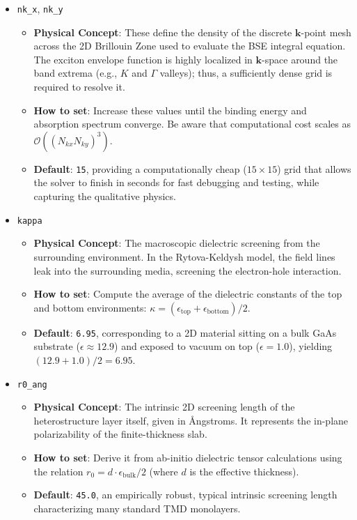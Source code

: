\documentclass[11pt, a4paper]{article}
\begin{document}
\begin{itemize}
    \item \texttt{nk\_x}, \texttt{nk\_y}
    \begin{itemize}
        \item \textbf{Physical Concept}: These define the density of the discrete $\mathbf{k}$-point mesh across the 2D Brillouin Zone used to evaluate the BSE integral equation. The exciton envelope function is highly localized in $\mathbf{k}$-space around the band extrema (e.g., $K$ and $\Gamma$ valleys); thus, a sufficiently dense grid is required to resolve it.
        \item \textbf{How to set}: Increase these values until the binding energy and absorption spectrum converge. Be aware that computational cost scales as $\mathcal{O}((N_{kx}N_{ky})^3)$.
        \item \textbf{Default}: \texttt{15}, providing a computationally cheap ($15\times15$) grid that allows the solver to finish in seconds for fast debugging and testing, while capturing the qualitative physics.
    \end{itemize}
    \item \texttt{kappa}
    \begin{itemize}
        \item \textbf{Physical Concept}: The macroscopic dielectric screening from the surrounding environment. In the Rytova-Keldysh model, the field lines leak into the surrounding media, screening the electron-hole interaction.
        \item \textbf{How to set}: Compute the average of the dielectric constants of the top and bottom environments: $\kappa = (\epsilon_{\text{top}} + \epsilon_{\text{bottom}})/2$. 
        \item \textbf{Default}: \texttt{6.95}, corresponding to a 2D material sitting on a bulk GaAs substrate ($\epsilon \approx 12.9$) and exposed to vacuum on top ($\epsilon = 1.0$), yielding $(12.9 + 1.0)/2 = 6.95$.
    \end{itemize}
    \item \texttt{r0\_ang}
    \begin{itemize}
        \item \textbf{Physical Concept}: The intrinsic 2D screening length of the heterostructure layer itself, given in \AA ngstroms. It represents the in-plane polarizability of the finite-thickness slab. 
        \item \textbf{How to set}: Derive it from ab-initio dielectric tensor calculations using the relation $r_0 = d \cdot \epsilon_{\text{bulk}}/2$ (where $d$ is the effective thickness).
        \item \textbf{Default}: \texttt{45.0}, an empirically robust, typical intrinsic screening length characterizing many standard TMD monolayers.
    \end{itemize}
\end{itemize}
\end{document}
